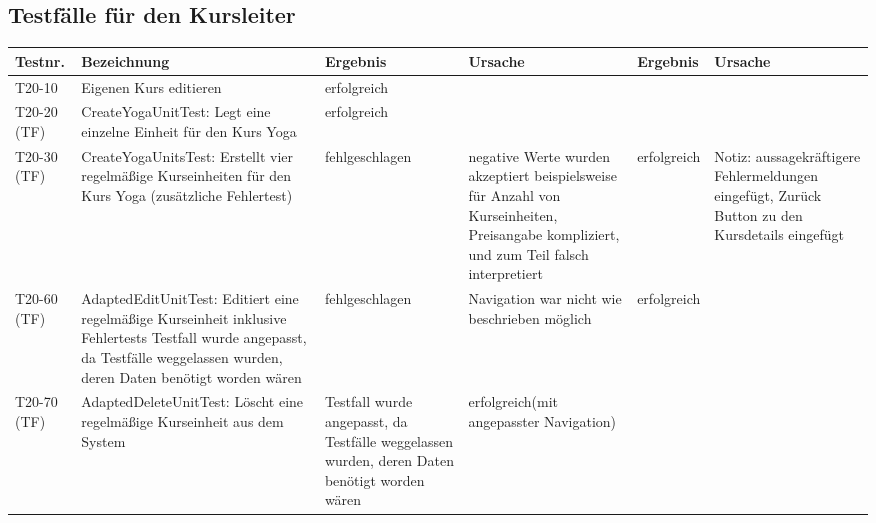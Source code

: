 \begin{landscape}
	\section{Testfälle für den Kursleiter}
		\begin{tabular}{|p{2.0cm} |p{5.0cm}|p{3.0cm}|p{5.0cm}|p{4.0cm}|p{4.0cm}|}
			\hline \textbf{Testnr.} & \textbf{Bezeichnung} & \textbf{Ergebnis} & \textbf{Ursache} & \textbf{Ergebnis} & \textbf{Ursache} \\
			\hline T20-10 & Eigenen Kurs editieren & erfolgreich &  &         &       \\
			\hline  T20-20 (TF)     & CreateYogaUnitTest: Legt eine einzelne Einheit für den Kurs Yoga  &  erfolgreich      	& 	&  &       \\
			
			\hline  T20-30 (TF)     & CreateYogaUnitsTest: Erstellt vier regelmäßige Kurseinheiten für den Kurs Yoga (zusätzliche Fehlertest)  &   fehlgeschlagen      
			& negative Werte wurden akzeptiert beispielsweise für Anzahl von Kurseinheiten, Preisangabe kompliziert, und zum Teil falsch interpretiert
			&  erfolgreich       &  Notiz: aussagekräftigere Fehlermeldungen eingefügt, Zurück Button zu den Kursdetails eingefügt      \\
						
			\hline  T20-60 (TF)     & AdaptedEditUnitTest: Editiert eine regelmäßige Kurseinheit inklusive Fehlertests 
			Testfall wurde angepasst, da Testfälle weggelassen wurden, deren Daten benötigt worden wären &   fehlgeschlagen      
			& Navigation war nicht wie beschrieben möglich
			&  erfolgreich       &     \\
						
			\hline  T20-70 (TF)     & AdaptedDeleteUnitTest: Löscht eine regelmäßige Kurseinheit aus dem System
			& Testfall wurde angepasst, da Testfälle weggelassen wurden, deren Daten benötigt worden wären			
			& erfolgreich(mit angepasster Navigation)     
			& 
			&     \\
			\hline 
		\end{tabular} \ \\
		\ \\
				

\end{landscape}
